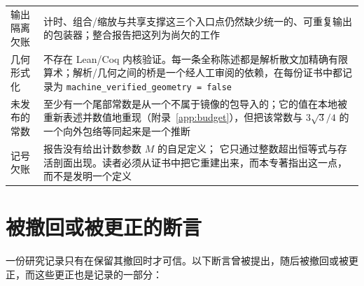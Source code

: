 {\begin{longtable}{@{}>{\raggedright\arraybackslash}p{}>{\raggedright\arraybackslash}p{}@{}}
输出隔离欠账 & 计时、组合/缩放与共享支撑这三个入口点仍然缺少统一的、可重复输出的包装器；整合报告把这列为尚欠的工作 \\
几何形式化 & 不存在 Lean/Coq 内核验证。每一条全称陈述都是解析散文加精确有限算术；解析/几何之间的桥是一个经人工审阅的依赖，在每份证书中都记录为 \texttt{machine\_\allowbreak{}verified\_\allowbreak{}geometry = false} \\
未发布的常数 & 至少有一个尾部常数是从一个不属于镜像的包导入的；它的值在本地被重新表述并数值地重现（附录~\ref{app:budget}），但把该常数与 $3\sqrt3/4$ 的一个向外包络等同起来是一个推断 \\
记号欠账 & 报告没有给出计数参数 $M$ 的自足定义；
它只通过整数超出恒等式与存活剖面出现。读者必须从证书中把它重建出来，而本专著指出这一点，而不是发明一个定义 \\
\end{longtable}}


\section{被撤回或被更正的断言}

一份研究记录只有在保留其撤回时才可信。以下断言曾被提出，随后被撤回或被更正，而这些更正也是记录的一部分：


